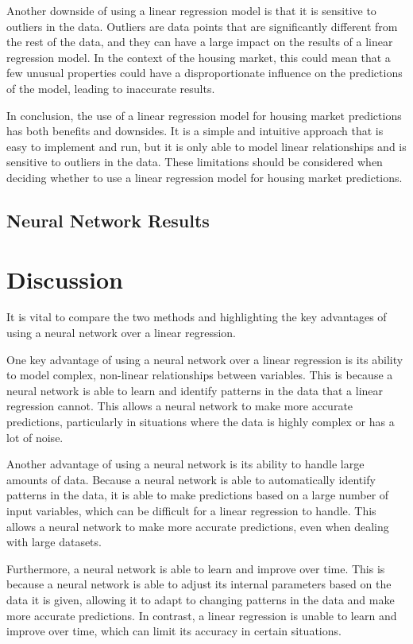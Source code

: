 \documentclass[11pt]{article}
\begin{document}
Another downside of using a linear regression model is that it is sensitive to outliers in the data. Outliers are data points that are significantly different from the rest of the data, and they can have a large impact on the results of a linear regression model. In the context of the housing market, this could mean that a few unusual properties could have a disproportionate influence on the predictions of the model, leading to inaccurate results.

In conclusion, the use of a linear regression model for housing market predictions has both benefits and downsides. It is a simple and intuitive approach that is easy to implement and run, but it is only able to model linear relationships and is sensitive to outliers in the data. These limitations should be considered when deciding whether to use a linear regression model for housing market predictions.

\subsection{Neural Network Results}


\section{Discussion}
It is vital to compare the two methods and highlighting the key advantages of using a neural network over a linear regression.

One key advantage of using a neural network over a linear regression is its ability to model complex, non-linear relationships between variables. This is because a neural network is able to learn and identify patterns in the data that a linear regression cannot. This allows a neural network to make more accurate predictions, particularly in situations where the data is highly complex or has a lot of noise.

Another advantage of using a neural network is its ability to handle large amounts of data. Because a neural network is able to automatically identify patterns in the data, it is able to make predictions based on a large number of input variables, which can be difficult for a linear regression to handle. This allows a neural network to make more accurate predictions, even when dealing with large datasets.

Furthermore, a neural network is able to learn and improve over time. This is because a neural network is able to adjust its internal parameters based on the data it is given, allowing it to adapt to changing patterns in the data and make more accurate predictions. In contrast, a linear regression is unable to learn and improve over time, which can limit its accuracy in certain situations.
\end{document}

